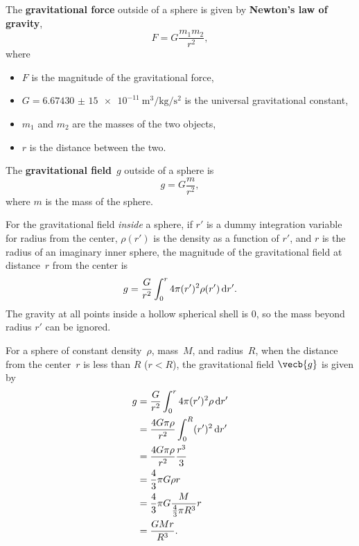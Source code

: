 The \textbf{gravitational force} outside of a sphere is given by
\textbf{Newton's law of gravity},
\begin{equation} \label{eq:newtons-law-of-gravity}
    F = G \frac{m_1 m_2}{r^2},
\end{equation}
where
\begin{itemize}
    \item \(F\) is the magnitude of the gravitational force,
    \item \(G = \qty{6.674 30(15)e-11}{\metre\cubed \per \kilogram \per
        \second\squared}\)
        is the universal gravitational constant, \autocite{nist-G}
    \item \(m_1\) and \(m_2\) are the masses of the two objects,
    \item \(r\) is the distance between the two.
\end{itemize}

The \textbf{gravitational field}~\(g\) outside of a sphere is
\begin{equation}
    g = G \frac{m}{r^2},
\end{equation}
where \(m\) is the mass of the sphere.

For the gravitational field \emph{inside} a sphere,
if \(r'\) is a dummy integration variable for radius from the center,
\(\rho(r')\) is the density as a function of \(r'\),
and \(r\) is the radius of an imaginary inner sphere,
the magnitude of the gravitational field at distance~\(r\)
from the center is
\begin{equation}
    g = \frac{G}{r^2}
    \int_{0}^{r} 4\pi (r')^2 \rho(r') \odif{r'}.
\end{equation}
The gravity at all points inside a hollow spherical shell is 0,
so the mass beyond radius \(r'\) can be ignored.

For a sphere of constant density~\(\rho\), mass~\(M\),
and radius~\(R\),
when the distance from the center~\(r\) is less than \(R\) (\(r < R\)),
the gravitational field \(\vecb{g}\) is given by
\begin{equation}
    \begin{aligned}
        g &= \frac{G}{r^2} \int_{0}^{r} 4\pi
        (r')^2 \rho \odif{r'} \\
        &= \frac{4 G \pi \rho}{r^2}
        \int_{0}^{R} (r')^2 \odif{r'} \\
        &= \frac{4 G \pi \rho}{r^2} \frac{r^3}{3} \\
        &= \frac{4}{3} \pi G \rho r \\
        &= \frac{4}{3} \pi G \frac{M}{\frac{4}{3} \pi R^3} r \\
        &= \frac{G M r}{R^3}.
    \end{aligned}
\end{equation}

